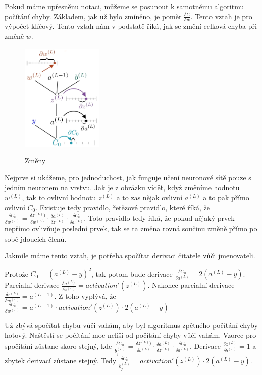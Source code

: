 Pokud máme upřesněnu notaci, můžeme se posunout k samotnému algoritmu počítání chyby.
Základem, jak už bylo zmíněno, je poměr \(\frac{\delta C}{\delta w}\). Tento vztah je pro výpočet klíčový.
Tento vztah nám v podstatě říká, jak se změní celková chyba při změně \(w\).

\begin{figure}[h]
    \centering
    \includegraphics[width=0.35\textwidth]{images/delta.png}
    \caption{Změny} \cite{delta}
\end{figure}

Nejprve si ukážeme, pro jednoduchost, jak funguje učení neuronové sítě pouze s jedním neuronem na vrstvu. Jak je z obrázku vidět, když změníme hodnotu \(w^{(L)}\), tak to ovlivní hodnotu \(z^{(L)}\) a to zas nějak ovlivní \(a^{(L)}\) a to pak přímo ovlivní \(C_0\).
Existuje tedy pravidlo, řetězové pravidlo\cite{chain_rule}, které říká, že \(\frac{\delta C_0}{\delta w^{(L)}} = \frac{\delta z^{(L)})}{\delta w^{(L)}} \cdot \frac{\delta a^{(L)}}{\delta z^{(L)}} \cdot \frac{\delta C_0}{\delta a^{(L)}}\).
Toto pravidlo tedy říká, že pokud nějaký prvek nepřímo ovlivňuje poslední prvek, tak se ta změna rovná součinu změně přímo po sobě jdoucích členů.

Jakmile máme tento vztah, je potřeba spočítat derivaci čitatele vůči jmenovateli.

Protože \(C_0 = (a^{(L)} - y)^2\), tak potom bude derivace \(\frac{\delta C_0}{\delta a^{(L)}}= 2(a^{(L)} - y)\).
Parcialní derivace \(\frac{\delta a^{(L)}}{\delta z^{(L)}} = activation'(z^{(L)}) \).
Nakonec parcialní derivace \(\frac{\delta z^{(L)}}{\delta w^{(L)}} = a^{(L-1)}\).
Z toho vyplývá, že \(\frac{\delta C_0}{\delta w^{(L)}} = a^{(L-1)} \cdot activation'(z^{(L)}) \cdot 2(a^{(L)} - y)\)

Už zbývá spočítat chybu vůči vahám, aby byl algoritmus zpětného počítání chyby hotový.
Naštěstí se počítání moc neliší od počítání chyby vůči vahám.
Vzorec pro spočítání zůstane skoro stejný, kde \(\frac{\delta C_0}{b_j^{(L)}} = \frac{\delta z^{(L)})}{\delta b^{(L)}} \cdot \frac{\delta a^{(L)}}{\delta z^{(L)}} \cdot \frac{\delta C_0}{\delta a^{(L)}} \).
Derivace \(\frac{\delta z^{(L)}}{\delta b^{(L)}} = 1 \) a zbytek derivací zůstane stejný. Tedy \(\frac{\delta C_0}{b_j^{(L)}} =  activation'(z^{(L)}) \cdot 2(a^{(L)} - y)\).

